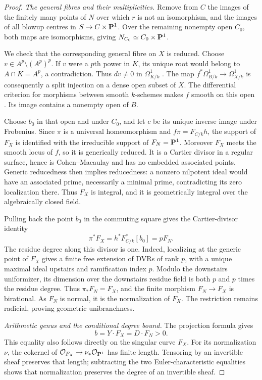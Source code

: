 \begin{proof}
\emph{The general fibres and their multiplicities.}
Remove from $C$ the images of the finitely many points of $N$ over
which $r$ is not an isomorphism, and the images of all blowup centres
in $S\to C\times\mathbf P^1$. Over the remaining nonempty open $C_0$,
both maps are isomorphisms, giving
$N_{C_0}\simeq C_0\times\mathbf P^1$.

We check that the corresponding general fibre on $X$ is reduced.
Choose $v\in A^p\setminus(A^p)^p$. If $v$ were a $p$th power in $K$,
its unique root would belong to $A\cap K=A^p$, a contradiction.
Thus $dv\ne0$ in $\Omega^1_{K/k}$ \cite[Tag~031W]{Stacks}.
The map $f^*\Omega^1_{B/k}\to\Omega^1_{X/k}$ is consequently a
split injection on a dense open subset of $X$. The differential
criterion for morphisms between smooth $k$-schemes makes $f$ smooth
on this open \cite[IV, Theorem~17.11.1]{EGA}. Its image contains a
nonempty open of $B$.

Choose $b_0$ in that open and under $C_0$, and let $c$ be its unique
inverse image under Frobenius. Since $\pi$ is a universal
homeomorphism and $f\pi=F_{C/k}h$, the support of $F_X$ is identified
with the irreducible support of $F_N=\mathbf P^1$.
Moreover $F_X$ meets the smooth locus of $f$, so it is generically
reduced. It is a Cartier divisor in a regular surface, hence is
Cohen--Macaulay and has no embedded associated points.
Generic reducedness then implies reducedness: a nonzero nilpotent
ideal would have an associated prime, necessarily a minimal prime,
contradicting its zero localization there. Thus $F_X$ is integral,
and it is geometrically integral over the algebraically closed field.

Pulling back the point $b_0$ in the commuting square gives the
Cartier-divisor identity
\[
 \pi^*F_X=h^*F_{C/k}^*[b_0]=pF_N.
\]
The residue degree along this divisor is one. Indeed, localizing at
the generic point of $F_X$ gives a finite free extension of DVRs of
rank $p$, with a unique maximal ideal upstairs and ramification
index $p$. Modulo the downstairs uniformizer, its dimension over
the downstairs residue field is both $p$ and $p$ times the residue
degree. Thus $\pi_*F_N=F_X$, and the finite morphism
$F_N\to F_X$ is birational. As $F_N$ is normal, it is the
normalization of $F_X$. The restriction remains radicial, proving
geometric unibranchness.

\emph{Arithmetic genus and the conditional degree bound.}
The projection formula gives
\[
 b=Y\cdot F_X=D\cdot F_N>0.
\]
This equality also follows directly on the singular curve $F_X$.
For its normalization $\nu$, the cokernel of
$\mathcal O_{F_X}\to\nu_*\mathcal O_{\mathbf P^1}$ has finite length. Tensoring by an
invertible sheaf preserves that length; subtracting the two
Euler-characteristic equalities shows that normalization preserves
the degree of an invertible sheaf.


\end{proof}
